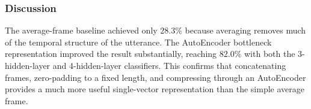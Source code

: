 \subsubsection{Discussion}
The average-frame baseline achieved only $28.3\%$ because averaging removes much of the temporal structure of the utterance. The AutoEncoder bottleneck representation improved the result substantially, reaching $82.0\%$ with both the 3-hidden-layer and 4-hidden-layer classifiers. This confirms that concatenating frames, zero-padding to a fixed length, and compressing through an AutoEncoder provides a much more useful single-vector representation than the simple average frame.
